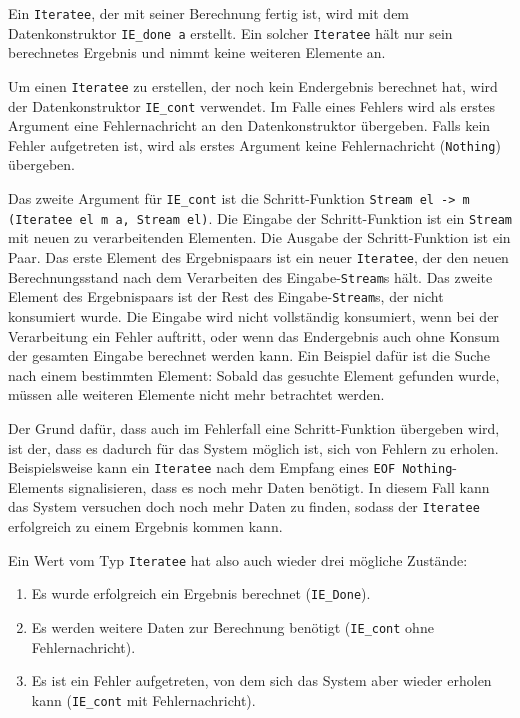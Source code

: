 \documentclass[draft=false
              ,paper=a4
              ,twoside=false
              ,fontsize=11pt
              ,headsepline
              ,BCOR10mm
              ,DIV11
              ]{scrbook}
\begin{document}
Ein \lstinline|Iteratee|, der mit seiner Berechnung fertig ist, wird mit dem Datenkonstruktor \lstinline[breaklines=true]|IE_done a| erstellt.
Ein solcher \lstinline|Iteratee| hält nur sein berechnetes Ergebnis und nimmt keine weiteren Elemente an.

Um einen \lstinline|Iteratee| zu erstellen, der noch kein Endergebnis berechnet hat, wird der Datenkonstruktor \lstinline|IE_cont| verwendet.
Im Falle eines Fehlers wird als erstes Argument eine Fehlernachricht an den Datenkonstruktor übergeben.
Falls kein Fehler aufgetreten ist, wird als erstes Argument keine Fehlernachricht (\lstinline|Nothing|) übergeben.

Das zweite Argument für \lstinline|IE_cont| ist die Schritt-Funktion \lstinline[breaklines=true]|Stream el -> m (Iteratee el m a, Stream el)|.
Die Eingabe der Schritt-Funktion ist ein \lstinline|Stream| mit neuen zu verarbeitenden Elementen.
Die Ausgabe der Schritt-Funktion ist ein Paar.
Das erste Element des Ergebnispaars ist ein neuer \lstinline|Iteratee|, der den neuen Berechnungsstand nach dem Verarbeiten des Eingabe-\lstinline|Stream|s hält.
Das zweite Element des Ergebnispaars ist der Rest des Eingabe-\lstinline|Stream|s, der nicht konsumiert wurde.
Die Eingabe wird nicht vollständig konsumiert, wenn bei der Verarbeitung ein Fehler auftritt, oder wenn das Endergebnis auch ohne Konsum der gesamten Eingabe berechnet werden kann.
Ein Beispiel dafür ist die Suche nach einem bestimmten Element: Sobald das gesuchte Element gefunden wurde, müssen alle weiteren Elemente nicht mehr betrachtet werden.

Der Grund dafür, dass auch im Fehlerfall eine Schritt-Funktion übergeben wird, ist der, dass es dadurch für das System möglich ist, sich von Fehlern zu erholen.
Beispielsweise kann ein \lstinline|Iteratee| nach dem Empfang eines \lstinline|EOF Nothing|-Elements signalisieren, dass es noch mehr Daten benötigt.
In diesem Fall kann das System versuchen doch noch mehr Daten zu finden, sodass der \lstinline|Iteratee| erfolgreich zu einem Ergebnis kommen kann.

Ein Wert vom Typ \lstinline|Iteratee| hat also auch wieder drei mögliche Zustände:
\begin{enumerate}
  \item Es wurde erfolgreich ein Ergebnis berechnet (\lstinline|IE_Done|).
  \item Es werden weitere Daten zur Berechnung benötigt (\lstinline|IE_cont| ohne Fehlernachricht).
  \item Es ist ein Fehler aufgetreten, von dem sich das System aber wieder erholen kann (\lstinline|IE_cont| mit Fehlernachricht).
\end{enumerate}
\end{document}
